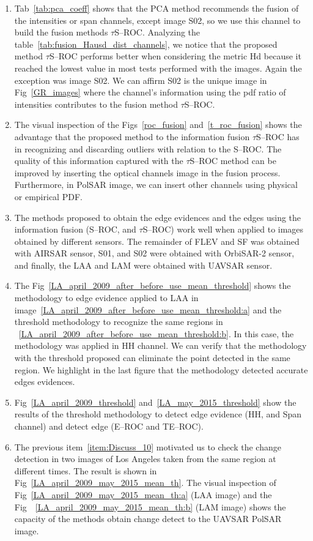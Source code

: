 \documentclass[remotesensing,article,submit,pdftex,moreauthors]{Definitions/mdpi}
\begin{document}
\begin{enumerate}[label=(\roman*)]
%
\item Tab~\eqref{tab:pca_coeff} shows that the PCA method recommends the fusion of the intensities or span channels, except image S02, so we use this channel to build the fusion methods $\tau$S--ROC. 
Analyzing the table~\eqref{tab:fusion_Hausd_dist_channels}, we notice that the proposed method $\tau$S--ROC performs better when considering the metric Hd because it reached the lowest value in most tests performed with the images. Again the exception was image S02. 
We can affirm  S02 is the unique image in Fig~\eqref{GR_images} where the channel's information using the pdf ratio of intensities contributes to the fusion method $\tau$S--ROC.  
 \label{item:Discuss_06}
%
\item The visual inspection of the Figs~\eqref{roc_fusion} and~\eqref{t_roc_fusion} shows the advantage that the proposed method to the information fusion $\tau$S--ROC has in recognizing and discarding outliers with relation to the S--ROC. The quality of this information captured with the $\tau$S--ROC method can be improved by inserting the optical channels image in the fusion process. Furthermore, in PolSAR image, we can insert other channels using physical or empirical PDF.
 \label{item:Discuss_07}
% 
\item The methods proposed to obtain the edge evidences and the edges using the information fusion (S--ROC, and $\tau$S--ROC)  work well when applied to images obtained by different sensors. The remainder of FLEV and SF was obtained with AIRSAR sensor, S01, and S02 were obtained with OrbiSAR-2 sensor, and finally, the LAA and LAM were obtained with UAVSAR sensor. \label{item:Discuss_08}
\item  The Fig~\eqref{LA_april_2009_after_before_use_mean_threshold} shows the methodology to edge evidence applied to LAA in image~\eqref{LA_april_2009_after_before_use_mean_threshold:a} and the threshold methodology to recognize the same regions in ~\eqref{LA_april_2009_after_before_use_mean_threshold:b}. In this case, the methodology was applied in HH channel. We can verify that the methodology with the threshold proposed can eliminate the point detected in the same region. We highlight in the last figure that the methodology detected accurate edges evidences. \label{item:Discuss_9}
\item Fig~\eqref{LA_april_2009_threshold} and~\eqref{LA_may_2015_threshold} show the results of the threshold methodology to detect edge evidence (HH, and Span channel) and detect edge (E--ROC and TE--ROC). \label{item:Discuss_10}
\item The previous item~\ref{item:Discuss_10} motivated us to check the change detection in two images of Los Angeles taken from the same region at different times. The result is shown in Fig~\eqref{LA_april_2009_may_2015_mean_th}. The visual inspection of Fig~\eqref{LA_april_2009_may_2015_mean_th:a}  (LAA image) and the Fig~~\eqref{LA_april_2009_may_2015_mean_th:b} (LAM image) shows the capacity of the methods obtain change detect to the UAVSAR PolSAR image. \label{item:Discuss_11}


\end{enumerate}
\end{document}
